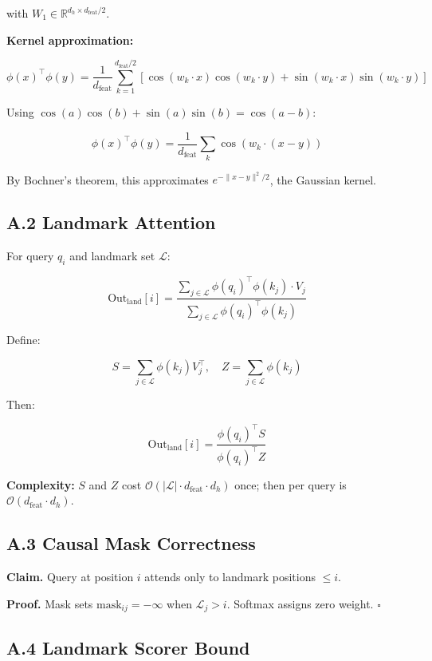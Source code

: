 with $W_1 \in \mathbb{R}^{d_h \times d_\text{feat}/2}$.

\textbf{Kernel approximation:}

\[
\phi(x)^\top \phi(y) = \frac{1}{d_\text{feat}} \sum_{k=1}^{d_\text{feat}/2} [\cos(w_k \cdot x) \cos(w_k \cdot y) + \sin(w_k \cdot x) \sin(w_k \cdot y)]
\tag{A.2}
\]

Using $\cos(a)\cos(b) + \sin(a)\sin(b) = \cos(a - b)$:

\[
\phi(x)^\top \phi(y) = \frac{1}{d_\text{feat}} \sum_k \cos(w_k \cdot (x - y))
\tag{A.3}
\]

By Bochner's theorem, this approximates $e^{-\|x-y\|^2/2}$, the Gaussian kernel.

\subsection{A.2 Landmark Attention}

For query $q_i$ and landmark set $\mathcal{L}$:

\[
\text{Out}_\text{land}[i] = \frac{\sum_{j \in \mathcal{L}} \phi(q_i)^\top \phi(k_j) \cdot V_j}{\sum_{j \in \mathcal{L}} \phi(q_i)^\top \phi(k_j)}
\tag{A.4}
\]

Define:

\[
S = \sum_{j \in \mathcal{L}} \phi(k_j) V_j^\top, \quad Z = \sum_{j \in \mathcal{L}} \phi(k_j)
\tag{A.5}
\]

Then:

\[
\text{Out}_\text{land}[i] = \frac{\phi(q_i)^\top S}{\phi(q_i)^\top Z}
\tag{A.6}
\]

\textbf{Complexity:} $S$ and $Z$ cost $\mathcal{O}(|\mathcal{L}| \cdot d_\text{feat} \cdot d_h)$ 
once; then per query is $\mathcal{O}(d_\text{feat} \cdot d_h)$.

\subsection{A.3 Causal Mask Correctness}

\textbf{Claim.} Query at position $i$ attends only to landmark positions $\leq i$.

\textbf{Proof.} Mask sets $\text{mask}_{ij} = -\infty$ when $\mathcal{L}_j > i$. 
Softmax assigns zero weight. $\square$

\subsection{A.4 Landmark Scorer Bound}

